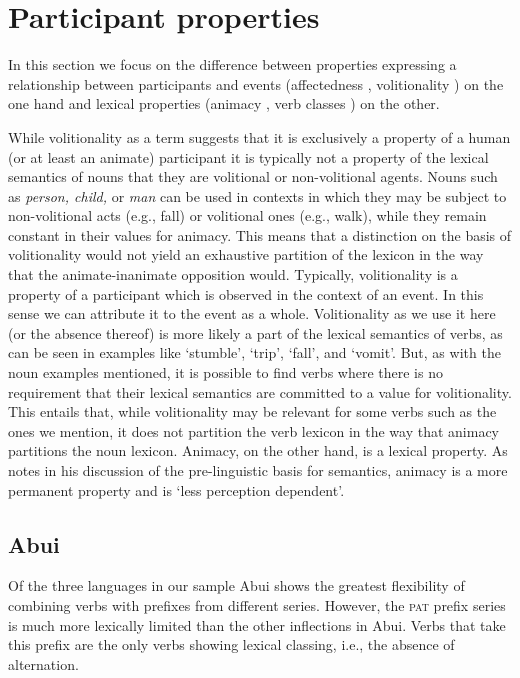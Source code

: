 \section{Participant properties}
\label{sec:10:5}
In this section we focus on the difference between properties expressing a relationship between participants and events (affectedness , volitionality ) on the one hand and lexical properties (animacy , verb classes ) on the other.

While volitionality as a term suggests that it is exclusively a property of a human (or at least an animate) participant it is typically not a property of the lexical semantics of nouns that they are volitional or non-volitional agents. Nouns such as \textit{person, child,} or \textit{man} can be used in contexts in which they may be subject to non-volitional acts (e.g., fall) or volitional ones (e.g., walk), while they remain constant in their values for animacy. This means that a distinction on the basis of volitionality would not yield an exhaustive partition of the lexicon in the way that the animate-inanimate opposition would. Typically, volitionality is a property of a participant which is observed in the context of an event. In this sense we can attribute it to the event as a whole. Volitionality as we use it here (or the absence thereof) is more likely a part of the lexical semantics of verbs, as can be seen in examples like `stumble', `trip', `fall', and `vomit'. But, as with the noun examples mentioned, it is possible to find verbs where there is no requirement that their lexical semantics are committed to a value for volitionality. This entails that, while volitionality may be relevant for some verbs such as the ones we mention, it does not partition the verb lexicon in the way that animacy partitions the noun lexicon.   Animacy, on the other hand, is a lexical property. As \citet[43]{Hurford2007} notes in his discussion of the pre-linguistic basis for semantics, animacy is a more permanent property and is `less perception dependent'.

\subsection{Abui} 
\label{sec:10:5.1}
Of the three languages in our sample Abui  shows the greatest flexibility of combining verbs with prefixes from different series. However, the \textsc{pat} prefix series is much more lexically limited than the other inflections  in Abui. Verbs that take this prefix are the only verbs showing lexical classing, i.e., the absence of alternation. 

